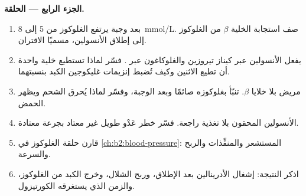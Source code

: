 \begin{problem}
\medskip
\noindent\textbf{الجزء الرابع --- الحلقة.}
\begin{enumerate}[resume]
  \item بعد وجبة يرتفع الغلوكوز من 5 إلى \qty{8}{mmol/L}.
        صف استجابة الخلية $\beta$ من الغلوكوز إلى
        إطلاق الأنسولين، مسميًا الاقتران.
  \item يفعل الأنسولين عبر كيناز تيروزين والغلوكاغون عبر
        . فسّر لماذا تستطيع خلية واحدة أن تطيع الاثنين وكيف
        تُضبط إنزيمات غليكوجين الكبد بنسبتهما.
  \item مريض بلا خلايا $\beta$. تنبّأ بغلوكوزه صائمًا
        وبعد الوجبة، وفسّر لماذا يُحرق الشحم ويظهر
        الحمض.
  \item الأنسولين المحقون بلا تغذية راجعة. فسّر خطر
        عَدْو طويل غير معتاد بجرعة معتادة.
  \item قارن حلقة الغلوكوز  في
        \cref{ch:b2:blood-pressure}: المستشعر والمنفِّذات والربح والسرعة.
  \item اذكر النتيجة: إشغال الأدرينالين بعد الإطلاق،
        وربح الشلال، وخرج الكبد من الغلوكوز، والزمن
        الذي يستغرقه الكورتيزول.
\end{enumerate}
\end{problem}

